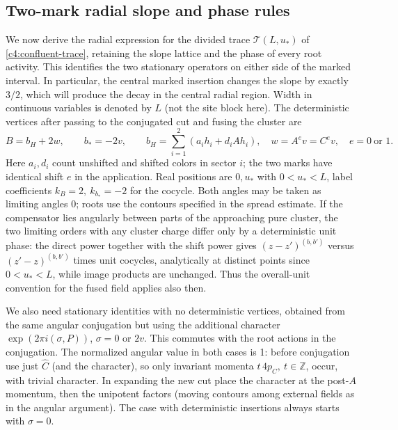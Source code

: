 \subsection{Two-mark radial slope and phase rules}\label{c4:pair-radial}

We now derive the radial expression for the divided trace
\(\mathcal T(L,u_*)\) of \eqref{c4:confluent-trace}, retaining the slope
lattice and the phase of every root activity. This identifies the two
stationary operators on either side of the marked interval.
In particular, the central marked insertion
changes the slope by exactly \(3/2\), which will produce the decay in the
central radial region. Width in continuous variables is denoted by \(L\) (not the site block here). The deterministic vertices after passing to the conjugated cut and fusing the cluster are
\[
 B=b_H+2w,\qquad b_*= -2v,\qquad
 b_H=\sum_{i=1}^2(a_i h_i+d_i A h_i),\quad w=A^e v=C^e v,\quad e=0\ \text{or }1.
\]
Here \(a_i,d_i\) count unshifted and shifted colors in sector \(i\); the two marks have identical shift \(e\) in the application. Real positions are \(0,u_*\) with \(0<u_*<L\), label coefficients \(k_B=2,\ k_{b_*}=-2\) for the cocycle. Both angles may be taken as limiting angles 0; roots use the contours specified in the spread estimate. If the compensator lies angularly between parts of the approaching pure cluster, the two limiting orders with any cluster charge differ only by a deterministic unit phase: the direct power together with the shift power gives \((z-z')^{(b,b')}\) versus \((z'-z)^{(b,b')}\) times unit cocycles, analytically at distinct points since \(0<u_*<L\), while image products are unchanged. Thus the overall-unit convention for the fused field applies also then.

We also need stationary identities with no deterministic vertices, obtained from the same angular conjugation but using the additional character \(\exp(2\pi i(\sigma,P))\), \(\sigma=0\) or \(2v\). This commutes with the root actions in the conjugation. The normalized angular value in both cases is 1: before conjugation use just \(\widehat C\) (and the character), so only invariant momenta \(t\,4p_C,\ t\in\mathbb Z\), occur, with trivial character. In expanding the new cut place the character at the post-\(A\) momentum, then the unipotent factors (moving contours among external fields as in the angular argument). The case with deterministic insertions always starts with \(\sigma=0\).

